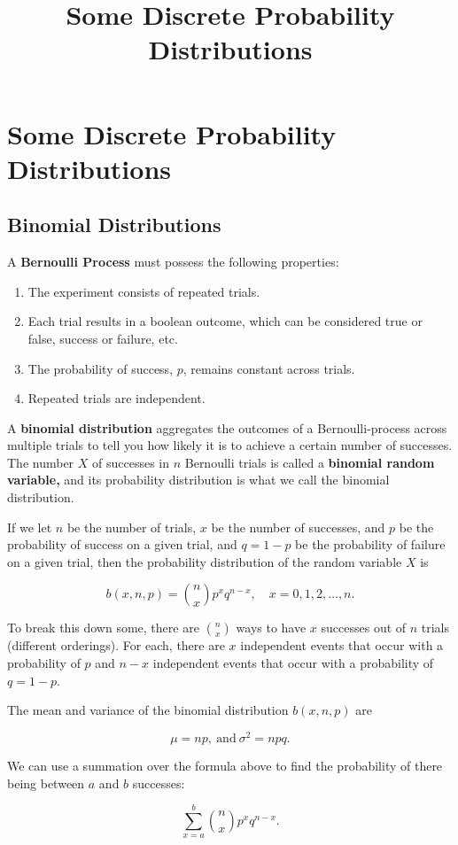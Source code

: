\documentclass{article}
\title{Some Discrete Probability Distributions}
\begin{document}
\section{Some Discrete Probability Distributions}

\subsection{Binomial Distributions}

\begin{definition}
A \textbf{Bernoulli Process} must possess the following properties:

\begin{enumerate}
\item The experiment consists of repeated trials.
\item Each trial results in a boolean outcome, which can be considered true or false, success or failure, etc.
\item The \@{probability} of success, $p$, remains constant across trials.
\item Repeated trials are \@{independent}.
\end{enumerate}
\end{definition}

\begin{definition}
A \textbf{binomial distribution} aggregates the outcomes of a \@{Bernoulli-process} across multiple trials to tell you how likely it is to achieve a certain number of successes. The number $X$ of successes in $n$ Bernoulli trials is called a \textbf{binomial random variable,} and its \@{probability distribution} is what we call the binomial distribution.

If we let $n$ be the number of trials, $x$ be the number of successes, and $p$ be the probability of success on a given trial, and $q = 1 - p$ be the probability of failure on a given trial, then the probability distribution of the \@{random variable} $X$ is

\[ b(x, n, p) = {n \choose x}p^x q^{n-x}, \quad x = 0, 1, 2, \dots, n. \]

To break this down some, there are ${n \choose x}$ ways to have $x$ successes out of $n$ trials (different orderings). For each, there are $x$ \@{independent} \@{events} that occur with a \@{probability} of $p$ and $n - x$ independent events that occur with a probability of $q = 1 - p.$

The mean and \@{variance} of the binomial distribution $b(x, n, p)$ are

\[ \mu = np, ~ \text{and} ~ \sigma^2 = npq. \]

We can use a summation over the formula above to find the probability of there being between $a$ and $b$ successes:

\[ \sum_{x=a}^b{\binom{n}{x} p^x q^{n-x}}. \]
\end{definition}
\end{document}
